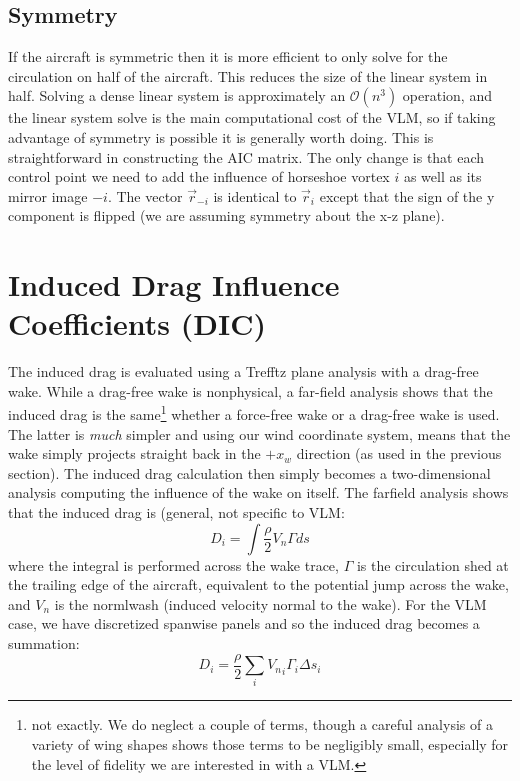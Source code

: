 \documentclass{article}
\begin{document}
\subsection{Symmetry}

If the aircraft is symmetric then it is more efficient to only solve for the circulation on half of the aircraft.  This reduces the size of the linear system in half.  Solving a dense linear system is approximately an $\mathcal{O}(n^3)$ operation, and the linear system solve is the main computational cost of the VLM, so if taking advantage of symmetry is possible it is generally worth doing.  This is straightforward in constructing the AIC matrix.  The only change is that each control point we need to add the influence of horseshoe vortex $i$ as well as its mirror image $-i$.  The vector $\vec{r}_{-i}$ is identical to $\vec{r}_{i}$ except that the sign of the y component is flipped (we are assuming symmetry about the x-z plane).

\section{Induced Drag Influence Coefficients (DIC)}

The induced drag is evaluated using a Trefftz plane analysis with a drag-free wake.  While a drag-free wake is nonphysical, a far-field analysis shows that the induced drag is the same\footnote{not exactly.  We do neglect a couple of terms, though a careful analysis of a variety of wing shapes shows those terms to be negligibly small, especially for the level of fidelity we are interested in with a VLM.} whether a force-free wake or a drag-free wake is used.  The latter is \emph{much} simpler and using our wind coordinate system, means that the wake simply projects straight back in the $+x_w$ direction (as used in the previous section).  The induced drag calculation then simply becomes a two-dimensional analysis computing the influence of the wake on itself.  The farfield analysis shows that the induced drag is (general, not specific to VLM:
\begin{equation}
D_i = \int \frac{\rho}{2} V_n \Gamma ds
\end{equation}
where the integral is performed across the wake trace, $\Gamma$ is the circulation shed at the trailing edge of the aircraft, equivalent to the potential jump across the wake, and $V_n$ is the normlwash (induced velocity normal to the wake).  For the VLM case, we have discretized spanwise panels and so the induced drag becomes a summation:
\begin{equation}
D_i = \frac{\rho}{2} \sum_i  {V_n}_i \Gamma_i \Delta s_i
\label{eq:idrag}
\end{equation}
\end{document}
